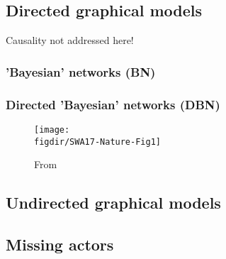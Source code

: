 \cite{Lau96} \cite{WaJ08}

\subsection{Directed graphical models}

Causality \citep{Pea09,Pea09b} not addressed here!

\subsubsection{'Bayesian' networks (BN)}

\subsubsection{Directed 'Bayesian' networks (DBN)}

\begin{figure}[H]
 \begin{center}
  \texttt{[image: \\figdir/SWA17-Nature-Fig1]}
  \caption{From \cite{SWA17}}
 \end{center}
\end{figure}

\subsection{Undirected graphical models}

\subsection{Missing actors}
